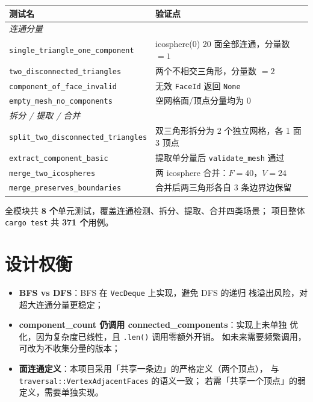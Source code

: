 \documentclass[11pt,a4paper]{article}
\begin{document}
\begin{center}
\renewcommand{\arraystretch}{1.18}
\begin{tabular}{@{}ll@{}}
  \toprule
  \textbf{测试名} & \textbf{验证点} \\
  \midrule
  \multicolumn{2}{l}{\textit{连通分量}} \\
  \texttt{single\_triangle\_one\_component}     & icosphere(0) 20 面全部连通，分量数 $= 1$ \\
  \texttt{two\_disconnected\_triangles}         & 两个不相交三角形，分量数 $= 2$ \\
  \texttt{component\_of\_face\_invalid}         & 无效 \texttt{FaceId} 返回 \texttt{None} \\
  \texttt{empty\_mesh\_no\_components}          & 空网格面/顶点分量均为 0 \\
  \midrule
  \multicolumn{2}{l}{\textit{拆分 / 提取 / 合并}} \\
  \texttt{split\_two\_disconnected\_triangles}  & 双三角形拆分为 2 个独立网格，各 1 面 3 顶点 \\
  \texttt{extract\_component\_basic}            & 提取单分量后 \texttt{validate\_mesh} 通过 \\
  \texttt{merge\_two\_icospheres}               & 两 icosphere 合并：$F = 40$，$V = 24$ \\
  \texttt{merge\_preserves\_boundaries}         & 合并后两三角形各自 3 条边界边保留 \\
  \bottomrule
\end{tabular}
\end{center}

全模块共 \textbf{8 个}单元测试，覆盖连通检测、拆分、提取、合并四类场景；
项目整体 \texttt{cargo test} 共 \textbf{371 个}用例。

\section{设计权衡}

\begin{itemize}
  \item \textbf{BFS vs DFS}：BFS 在 \texttt{VecDeque} 上实现，避免 DFS 的递归
        栈溢出风险，对超大连通分量更稳定；
  \item \textbf{component\_count 仍调用 connected\_components}：实现上未单独
        优化，因为复杂度已线性，且 \texttt{.len()} 调用零额外开销。
        如未来需要频繁调用，可改为不收集分量的版本；
  \item \textbf{面连通定义}：本项目采用「共享一条边」的严格定义（两个顶点），
        与 \texttt{traversal::VertexAdjacentFaces} 的语义一致；
        若需「共享一个顶点」的弱定义，需要单独实现。
\end{itemize}
\end{document}
